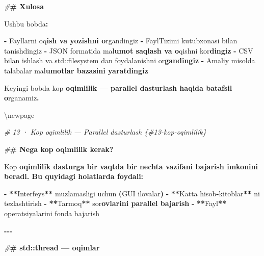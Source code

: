 \documentclass[a4paper,11pt,twoside,openright]{book}
\newenvironment{Shaded}{\begin{snugshade}}{\end{snugshade}}
\newcommand{\BuiltInTok}[1]{#1}
\newcommand{\CharTok}[1]{\textcolor[rgb]{0.31,0.60,0.02}{#1}}
\newcommand{\ErrorTok}[1]{\textcolor[rgb]{0.64,0.00,0.00}{\textbf{#1}}}
\newcommand{\NormalTok}[1]{#1}
\newcommand{\OperatorTok}[1]{\textcolor[rgb]{0.81,0.36,0.00}{\textbf{#1}}}
\newcommand{\PreprocessorTok}[1]{\textcolor[rgb]{0.56,0.35,0.01}{\textit{#1}}}
\begin{document}
\begin{Shaded}
\begin{Highlighting}[]
\PreprocessorTok{\#}\ErrorTok{\# Xulosa}

\NormalTok{Ushbu bobda}\OperatorTok{:}

\OperatorTok{{-}}\NormalTok{ Fayllarni o}\CharTok{\textquotesingle{}q}\ErrorTok{ish va yozishni o}\CharTok{\textquotesingle{}}\NormalTok{rgandingiz}
\OperatorTok{{-}} \ErrorTok{\textasciigrave{}}\NormalTok{FaylTizimi}\ErrorTok{\textasciigrave{}}\NormalTok{ kutubxonasi bilan tanishdingiz}
\OperatorTok{{-}}\NormalTok{ JSON formatida ma}\CharTok{\textquotesingle{}l}\ErrorTok{umot saqlash va o}\CharTok{\textquotesingle{}}\NormalTok{qishni ko}\CharTok{\textquotesingle{}r}\ErrorTok{dingiz}
\OperatorTok{{-}}\NormalTok{ CSV bilan ishlash va }\ErrorTok{\textasciigrave{}}\BuiltInTok{std::}\NormalTok{filesystem}\ErrorTok{\textasciigrave{}}\NormalTok{ dan foydalanishni o}\CharTok{\textquotesingle{}r}\ErrorTok{gandingiz}
\OperatorTok{{-}}\NormalTok{ Amaliy misolda talabalar ma}\CharTok{\textquotesingle{}l}\ErrorTok{umotlar bazasini yaratdingiz}

\NormalTok{Keyingi bobda ko}\CharTok{\textquotesingle{}p}\ErrorTok{ oqimlilik — parallel dasturlash haqida batafsil o}\CharTok{\textquotesingle{}}\NormalTok{rganamiz}\OperatorTok{.}


\NormalTok{\textbackslash{}newpage}

\PreprocessorTok{\# 13 · Ko\textquotesingle{}p oqimlilik — Parallel dasturlash \{\#13{-}kop{-}oqimlilik\}}

\PreprocessorTok{\#}\ErrorTok{\# Nega ko\textquotesingle{}p oqimlilik kerak?}

\NormalTok{Ko}\CharTok{\textquotesingle{}p}\ErrorTok{ oqimlilik dasturga bir vaqtda bir nechta vazifani bajarish imkonini beradi. Bu quyidagi holatlarda foydali:}

\OperatorTok{{-}} \OperatorTok{**}\NormalTok{Interfeys}\OperatorTok{**}\NormalTok{ muzlamasligi uchun }\OperatorTok{(}\NormalTok{GUI ilovalar}\OperatorTok{)}
\OperatorTok{{-}} \OperatorTok{**}\NormalTok{Katta hisob}\OperatorTok{{-}}\NormalTok{kitoblar}\OperatorTok{**}\NormalTok{ ni tezlashtirish}
\OperatorTok{{-}} \OperatorTok{**}\NormalTok{Tarmoq}\OperatorTok{**}\NormalTok{ so}\CharTok{\textquotesingle{}r}\ErrorTok{ovlarini parallel bajarish}
\OperatorTok{{-}} \OperatorTok{**}\NormalTok{Fayl}\OperatorTok{**}\NormalTok{ operatsiyalarini fonda bajarish}

\OperatorTok{{-}{-}{-}}

\PreprocessorTok{\#}\ErrorTok{\# \textasciigrave{}std::thread\textasciigrave{} — oqimlar}


\end{Highlighting}
\end{Shaded}
\end{document}

